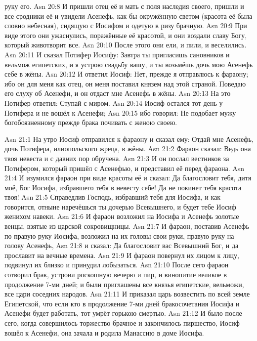 руку его.
\vs Asn 20:8
И пришли отец её и мать с
поля наследия своего, пришли и все сродники её и увидели Асенефь, как бы
окружённую светом (красота её была словно небесная), сидящую с Иосифом и
одетую в ризу брачную.
\vs Asn 20:9
При виде этого они
ужаснулись, поражённые её красотой, и они воздали славу Богу, который
животворит все.
\vs Asn 20:10
После этого они ели, и пили, и веселились.
\vs Asn 20:11
И сказал Потифер Иосифу:
Завтра ты пригласишь сановников и вельмож египетских, и я устрою свадьбу
вашу, и ты возьмёшь дочь мою Асенефь себе в жёны.
\vs Asn 20:12
И ответил Иосиф: Нет,
прежде я отправлюсь к фараону; ибо он для меня как отец, он меня поставил
князем над этой страной. Поведаю его слуху об Асенефи,
и он отдаст мне Асенефь в жёны.
\vs Asn 20:13
На это Потифер ответил:
Ступай с миром.
\vs Asn 20:14
Иосиф остался тот день у
Потифера и не вошёл к Асенефи;
\vs Asn 20:15
ибо говорил: Не подобает
мужу богобоязненному прежде брака почивать с женою своею.

\vs Asn 21:1
На утро Иосиф отправился к
фараону и сказал ему:
Отдай мне Асенефь, дочь Потифера,
илиопольского жреца, в жёны.
\vs Asn 21:2
Фараон сказал: Ведь она
твоя невеста и с давних пор обручена.
\vs Asn 21:3
И он послал вестников за
Потифером, который пришёл с Асенефью, и представил её перед фараона.
\vs Asn 21:4
И изумился фараон при виде
красоты её и сказал:
Да благословит тебя, дитя моё,
Бог Иосифа, избравшего тебя в невесту себе!
Да не покинет тебя красота твоя!
\vs Asn 21:5
Справедлив Господь,
избравший тебя для Иосифа, и как говорится, отныне наречёшься ты дочерью
Всевышнего, и будет тебе Иосиф женихом навеки.
\vs Asn 21:6
И фараон возложил на Иосифа
и Асенефь золотые венцы, взятые из царской сокровищницы.
\vs Asn 21:7
И фараон, поставив Асенефь
по правую руку Иосифа, возложил на их головы свои руки, правую руку на голову
Асенефь,
\vs Asn 21:8
и сказал: Да благословит
вас Всевышний Бог, и да прославит на вечные времена.
\vs Asn 21:9
И фараон повернул их лицом к
лицу, подвинул их близко и принудил лобызаться.
\vs Asn 21:10
После сего фараон сотворил брак,
устроил роскошную вечерю и пир, и винопитие великое в продолжение 7-ми
дней; и были приглашены все князья египетские, вельможи,
все цари соседних народов.
\vs Asn 21:11
И приказал царь возвестить
по всей земле Египетской, что если кто в продолжение 7-ми дней бракосочетания
Иосифа и Асенефи будет работать, тот умрёт горькою смертью.
\vs Asn 21:12
И было после сего, когда
совершилось торжество брачное и закончилось пиршество, Иосиф вошёл к Асенефи,
она зачала и родила Манассию в доме Иосифа.

